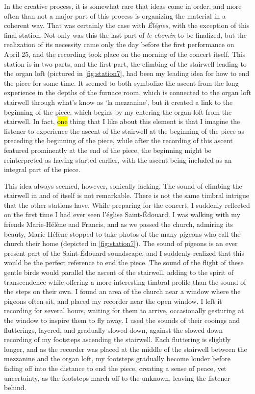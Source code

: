 \documentclass[12pt,twoside,maitrise]{dms_ks}
\theoremstyle{definition}
\begin{document}
{{In the creative process, it is somewhat rare that ideas come in order, and more often than not a major part of this process is organizing the material in a coherent way. 
That was certainly the case with \textit{Élégies}, with the exception of this final station. 
Not only was this the last part of \textit{le chemin} to be finalized, but the realization of its necessity came only the day before the first performance on April 25, and the recording took place on the morning of the concert itself. 
This station is in two parts, and the first part, the climbing of the stairwell leading to the organ loft (pictured in \cref{fig:station7}, had been my leading idea for how to end the piece for some time. 
It seemed to both symbolize the ascent from the long experience in the depths of the furnace room, which is connected to the organ loft stairwell through what's know as `la mezzanine', but it created a link to the beginning of the piece, which begins by my entering the organ loft from the stairwell. 
In fact, \hl{one} thing that I like about this element is that I imagine the listener to experience the ascent of the stairwell at the beginning of the piece as preceding the beginning of the piece, while after the recording of this ascent featured prominently at the end of the piece, the beginning might be reinterpreted as having started earlier, with the ascent being included as an integral part of the piece.

This idea always seemed, however, sonically lacking. 
The sound of climbing the stairwell in and of itself is not remarkable. 
There is not the same timbral intrigue that the other stations have. 
While preparing for the concert, I suddenly reflected on the first time I had ever seen l'église Saint-Édouard. 
I was walking with my friends Marie-Hélène and Francis, and as we passed the church, admiring its beauty, Marie-Hélène stopped to take photos of the many pigeons who call the church their home (depicted in \cref{fig:station7}). 
The sound of pigeons is an ever present part of the Saint-Édouard soundscape, and I suddenly realized that this would be the perfect reference to end the piece. 
The sound of the flight of these gentle birds would parallel the ascent of the stairwell, adding to the spirit of transcendence while offering a more interesting timbral profile than the sound of the steps on their own. 
I found an area of the church near a window where the pigeons often sit, and placed my recorder near the open window. 
I left it recording for several hours, waiting for them to arrive, occasionally gesturing at the window to inspire them to fly away. 
I used the sounds of their cooings and flutterings, layered, and gradually slowed down, against the slowed down recording of my footsteps ascending the stairwell. 
Each fluttering is slightly longer, and as the recorder was placed at the middle of the stairwell between the mezzanine and the organ loft, my footsteps gradually become louder before fading off into the distance to end the piece, creating a sense of peace, yet uncertainty, as the footsteps march off to the unknown, leaving the listener behind.

}}
\end{document}
